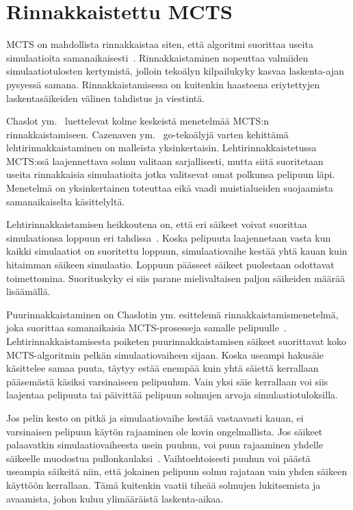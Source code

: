 \documentclass[12pt,finnish]{tktltiki2}
\theoremstyle{definition}
\theoremstyle{remark}
\begin{document}
\section{Rinnakkaistettu MCTS}

MCTS on mahdollista rinnakkaistaa siten, että algoritmi suorittaa useita simulaatioita samanaikaisesti~\cite{browne, cazenave}. Rinnakkaistaminen nopeuttaa valmiiden simulaatiotulosten kertymistä, jolloin tekoälyn kilpailukyky kasvaa laskenta-ajan pysyessä samana. Rinnakkaistamisessa on kuitenkin haasteena eriytettyjen laskentasäikeiden välinen tahdistus ja viestintä.

Chaslot ym.~\cite{chaslot} luettelevat kolme keskeistä menetelmää MCTS:n rinnakkaistamiseen. Cazenaven ym.~\cite{cazenave} go-tekoälyjä varten kehittämä lehtirinnakkaistaminen on malleista yksinkertaisin. Lehtirinnakkaistetussa MCTS:ssä laajennettava solmu valitaan sarjallisesti, mutta siitä suoritetaan useita rinnakkaisia simulaatioita jotka valitsevat omat polkunsa pelipuun läpi. Menetelmä on yksinkertainen toteuttaa eikä vaadi muistialueiden suojaamista samanaikaiselta käsittelyltä.

Lehtirinnakkaistamisen heikkoutena on, että eri säikeet voivat suorittaa simulaationsa loppuun eri tahdissa~\cite{chaslot}. Koska pelipuuta laajennetaan vasta kun kaikki simulaatiot on suoritettu loppuun, simulaatiovaihe kestää yhtä kauan kuin hitaimman säikeen simulaatio. Loppuun päässeet säikeet puolestaan odottavat toimettomina. Suorituskyky ei siis parane mielivaltaisen paljon säikeiden määrää lisäämällä.

Puurinnakkaistaminen on Chaslotin ym. esittelemä rinnakkaistamismenetelmä, joka suorittaa samanaikaisia MCTS-prosesseja samalle pelipuulle~\cite{chaslot}. Lehtirinnakkaistamisesta poiketen puurinnakkaistamisen säikeet suorittavat koko MCTS-algoritmin pelkän simulaatiovaiheen sijaan. Koska useampi hakusäie käsittelee samaa puuta, täytyy estää enempää kuin yhtä säiettä kerrallaan pääsemästä käsiksi varsinaiseen pelipuuhun. Vain yksi säie kerrallaan voi siis laajentaa pelipuuta tai päivittää pelipuun solmujen arvoja simulaatiotuloksilla.

Jos pelin kesto on pitkä ja simulaatiovaihe kestää vastaavasti kauan, ei varsinaisen pelipuun käytön rajaaminen ole kovin ongelmallista. Jos säikeet palaavatkin simulaatiovaiheesta usein puuhun, voi puun rajaaminen yhdelle säikeelle muodostua pullonkaulaksi~\cite{chaslot}. Vaihtoehtoisesti puuhun voi päästä useampia säikeitä niin, että jokainen pelipuun solmu rajataan vain yhden säikeen käyttöön kerrallaan. Tämä kuitenkin vaatii tiheää solmujen lukitsemista ja avaamista, johon kuluu ylimääräistä laskenta-aikaa.
\end{document}

